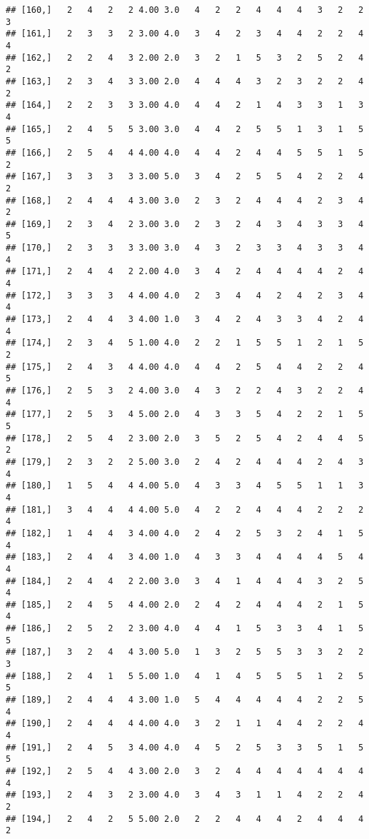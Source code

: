\documentclass[]{article}
\begin{document}
\begin{verbatim}
## [160,]   2   4   2   2 4.00 3.0   4   2   2   4   4   4   3   2   2   3
## [161,]   2   3   3   2 3.00 4.0   3   4   2   3   4   4   2   2   4   4
## [162,]   2   2   4   3 2.00 2.0   3   2   1   5   3   2   5   2   4   2
## [163,]   2   3   4   3 3.00 2.0   4   4   4   3   2   3   2   2   4   2
## [164,]   2   2   3   3 3.00 4.0   4   4   2   1   4   3   3   1   3   4
## [165,]   2   4   5   5 3.00 3.0   4   4   2   5   5   1   3   1   5   5
## [166,]   2   5   4   4 4.00 4.0   4   4   2   4   4   5   5   1   5   2
## [167,]   3   3   3   3 3.00 5.0   3   4   2   5   5   4   2   2   4   2
## [168,]   2   4   4   4 3.00 3.0   2   3   2   4   4   4   2   3   4   2
## [169,]   2   3   4   2 3.00 3.0   2   3   2   4   3   4   3   3   4   5
## [170,]   2   3   3   3 3.00 3.0   4   3   2   3   3   4   3   3   4   4
## [171,]   2   4   4   2 2.00 4.0   3   4   2   4   4   4   4   2   4   4
## [172,]   3   3   3   4 4.00 4.0   2   3   4   4   2   4   2   3   4   4
## [173,]   2   4   4   3 4.00 1.0   3   4   2   4   3   3   4   2   4   4
## [174,]   2   3   4   5 1.00 4.0   2   2   1   5   5   1   2   1   5   2
## [175,]   2   4   3   4 4.00 4.0   4   4   2   5   4   4   2   2   4   5
## [176,]   2   5   3   2 4.00 3.0   4   3   2   2   4   3   2   2   4   4
## [177,]   2   5   3   4 5.00 2.0   4   3   3   5   4   2   2   1   5   5
## [178,]   2   5   4   2 3.00 2.0   3   5   2   5   4   2   4   4   5   2
## [179,]   2   3   2   2 5.00 3.0   2   4   2   4   4   4   2   4   3   4
## [180,]   1   5   4   4 4.00 5.0   4   3   3   4   5   5   1   1   3   4
## [181,]   3   4   4   4 4.00 5.0   4   2   2   4   4   4   2   2   2   4
## [182,]   1   4   4   3 4.00 4.0   2   4   2   5   3   2   4   1   5   4
## [183,]   2   4   4   3 4.00 1.0   4   3   3   4   4   4   4   5   4   4
## [184,]   2   4   4   2 2.00 3.0   3   4   1   4   4   4   3   2   5   4
## [185,]   2   4   5   4 4.00 2.0   2   4   2   4   4   4   2   1   5   4
## [186,]   2   5   2   2 3.00 4.0   4   4   1   5   3   3   4   1   5   5
## [187,]   3   2   4   4 3.00 5.0   1   3   2   5   5   3   3   2   2   3
## [188,]   2   4   1   5 5.00 1.0   4   1   4   5   5   5   1   2   5   5
## [189,]   2   4   4   4 3.00 1.0   5   4   4   4   4   4   2   2   5   4
## [190,]   2   4   4   4 4.00 4.0   3   2   1   1   4   4   2   2   4   4
## [191,]   2   4   5   3 4.00 4.0   4   5   2   5   3   3   5   1   5   5
## [192,]   2   5   4   4 3.00 2.0   3   2   4   4   4   4   4   4   4   4
## [193,]   2   4   3   2 3.00 4.0   3   4   3   1   1   4   2   2   4   2
## [194,]   2   4   2   5 5.00 2.0   2   2   4   4   4   2   4   4   4   2

\end{verbatim}
\end{document}
